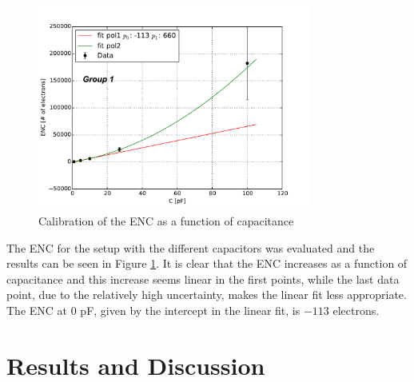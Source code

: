 \documentclass[12pt]{article}
\begin{document}
\begin{figure}[htb]
  \centering
  \includegraphics[width=0.8\textwidth]{./graphics/calibrationENC_diode}
  \caption{Calibration of the ENC as a function of capacitance} %
  \label{fig:ENC_vs_Capacitance}
\end{figure}

The ENC for the setup with the different capacitors was evaluated and the results can be seen in Figure \ref{fig:ENC_vs_Capacitance}. It is clear that the ENC increases as a function of capacitance and this increase seems linear in the first points, while the last data point, due to the relatively high uncertainty, makes the linear fit less appropriate. The ENC at $0$ pF, given by the intercept in the linear fit, is $-113$ electrons.


%
%

\section{Results and Discussion}
\end{document}

